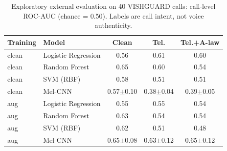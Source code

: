 \begin{table}[htbp]
\caption{Exploratory external evaluation on 40 VISHGUARD calls: call-level ROC-AUC (chance = 0.50). Labels are call intent, not voice authenticity.}
\begin{center}
\footnotesize\setlength{\tabcolsep}{3pt}
\begin{tabular}{llccc}
\toprule
Training & Model & Clean & Tel. & Tel.+A-law \\
\midrule
clean & Logistic Regression & 0.56 & 0.61 & 0.60 \\
clean & Random Forest & 0.65 & 0.60 & 0.54 \\
clean & SVM (RBF) & 0.58 & 0.51 & 0.51 \\
clean & Mel-CNN & 0.57$\pm$0.10 & 0.38$\pm$0.04 & 0.39$\pm$0.05 \\
aug & Logistic Regression & 0.55 & 0.55 & 0.54 \\
aug & Random Forest & 0.63 & 0.54 & 0.54 \\
aug & SVM (RBF) & 0.62 & 0.51 & 0.48 \\
aug & Mel-CNN & 0.65$\pm$0.08 & 0.63$\pm$0.12 & 0.65$\pm$0.12 \\
\bottomrule
\end{tabular}
\label{tab:vish}
\end{center}
\end{table}
